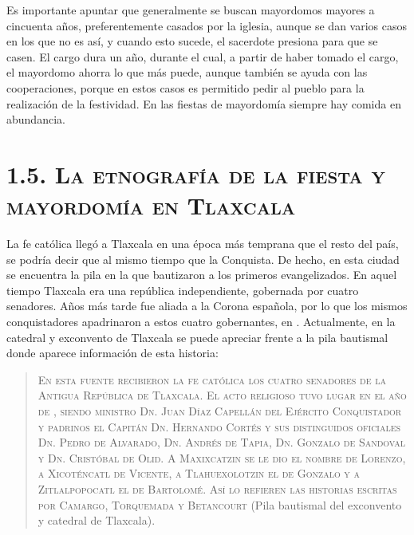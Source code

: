 \documentclass[14pt,letterpaper,twoside]{extbook} %
\begin{document}
\noindent Es importante apuntar que generalmente se buscan mayordomos mayores a cincuenta años, preferentemente casados por la iglesia, aunque se dan varios casos en los que no es así, y cuando esto sucede, el sacerdote presiona para que se casen. El cargo dura un año, durante el cual, a partir de haber tomado el cargo, el mayordomo ahorra lo que más puede, aunque también se ayuda con las cooperaciones, porque en estos casos es permitido pedir al pueblo para la realización de la festividad. En las fiestas de mayordomía siempre hay comida en abundancia.

\section*{\mdseries\large\textsc{1.5. La etnografía de la fiesta y mayordomía en Tlaxcala}}

\noindent La fe católica llegó a Tlaxcala en una época más temprana que el resto del país, se podría decir que al mismo tiempo que la Conquista. De hecho, en esta ciudad se encuentra la pila en la que bautizaron a los primeros evangelizados. En aquel tiempo Tlaxcala era una república independiente, gobernada por cuatro senadores. Años más tarde fue aliada a la Corona española, por lo que los mismos conquistadores apadrinaron a estos cuatro gobernantes, en . Actualmente, en la catedral y exconvento de Tlaxcala se puede apreciar frente a la pila bautismal donde aparece información de esta historia:

\begin{quotation}
\noindent \textsc{En esta fuente recibieron la fe católica los cuatro senadores de la Antigua República de Tlaxcala. El acto religioso tuvo lugar en el año de , siendo ministro Dn. Juan Díaz Capellán del Ejército Conquistador y padrinos el Capitán Dn. Hernando Cortés y sus distinguidos oficiales Dn. Pedro de Alvarado, Dn. Andrés de Tapia, Dn. Gonzalo de Sandoval y Dn. Cristóbal de Olid. A Maxixcatzin se le dio el nombre de Lorenzo, a Xicoténcatl de Vicente, a Tlahuexolotzin el de Gonzalo y a Zitlalpopocatl el de Bartolomé. Así lo refieren las historias escritas por Camargo, Torquemada y Betancourt} (Pila bautismal del exconvento y catedral de Tlaxcala).
\end{quotation}
\end{document}
